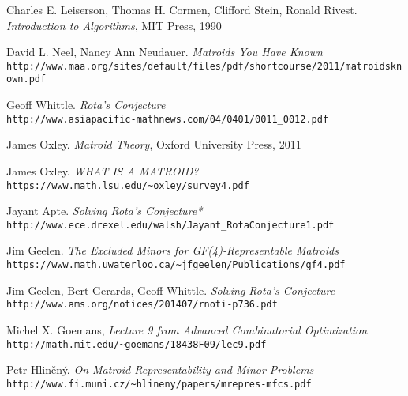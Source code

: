 
\begin{thebibliography}{12}

Charles E. Leiserson, Thomas H. Cormen, Clifford Stein, Ronald Rivest.
\textit{Introduction to Algorithms}, MIT Press, 1990

David L. Neel, Nancy Ann Neudauer. \textit{Matroids You Have Known}\\
\texttt{http://www.maa.org/sites/default/files/pdf/shortcourse/2011/matroidsknown.pdf}

Geoff Whittle. \textit{Rota's Conjecture}\\
\texttt{http://www.asiapacific-mathnews.com/04/0401/0011\_0012.pdf}

James Oxley. \textit{Matroid Theory}, Oxford University Press, 2011

James Oxley. \textit{WHAT IS A MATROID?}\\
\texttt{https://www.math.lsu.edu/\~{}oxley/survey4.pdf}

Jayant Apte. \textit{Solving Rota's Conjecture*}\\ 
\texttt{http://www.ece.drexel.edu/walsh/Jayant\_RotaConjecture1.pdf}

Jim Geelen. \textit{The Excluded Minors for GF(4)-Representable Matroids}\\
\texttt{https://www.math.uwaterloo.ca/\~{}jfgeelen/Publications/gf4.pdf}

Jim Geelen, Bert Gerards, Geoff Whittle. \textit{Solving Rota's Conjecture}\\
\texttt{http://www.ams.org/notices/201407/rnoti-p736.pdf}

Michel X. Goemans, \textit{Lecture 9 from Advanced Combinatorial Optimization}\\
\texttt{http://math.mit.edu/\~{}goemans/18438F09/lec9.pdf}

Petr Hlin\v{e}n\'{y}. \textit{On Matroid Representability and Minor Problems}\\
\texttt{http://www.fi.muni.cz/\~{}hlineny/papers/mrepres-mfcs.pdf}


\end{thebibliography}
